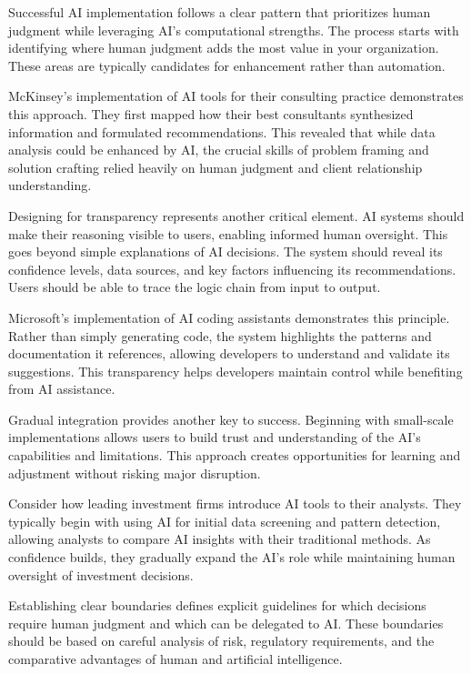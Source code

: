 \documentclass[
  Letterpaper,
]{scrbook}
\begin{document}
Successful AI implementation follows a clear pattern that prioritizes
human judgment while leveraging AI's computational strengths. The
process starts with identifying where human judgment adds the most value
in your organization. These areas are typically candidates for
enhancement rather than automation.

McKinsey's implementation of AI tools for their consulting practice
demonstrates this approach. They first mapped how their best consultants
synthesized information and formulated recommendations. This revealed
that while data analysis could be enhanced by AI, the crucial skills of
problem framing and solution crafting relied heavily on human judgment
and client relationship understanding.

Designing for transparency represents another critical element. AI
systems should make their reasoning visible to users, enabling informed
human oversight. This goes beyond simple explanations of AI decisions.
The system should reveal its confidence levels, data sources, and key
factors influencing its recommendations. Users should be able to trace
the logic chain from input to output.

Microsoft's implementation of AI coding assistants demonstrates this
principle. Rather than simply generating code, the system highlights the
patterns and documentation it references, allowing developers to
understand and validate its suggestions. This transparency helps
developers maintain control while benefiting from AI assistance.

Gradual integration provides another key to success. Beginning with
small-scale implementations allows users to build trust and
understanding of the AI's capabilities and limitations. This approach
creates opportunities for learning and adjustment without risking major
disruption.

Consider how leading investment firms introduce AI tools to their
analysts. They typically begin with using AI for initial data screening
and pattern detection, allowing analysts to compare AI insights with
their traditional methods. As confidence builds, they gradually expand
the AI's role while maintaining human oversight of investment decisions.

Establishing clear boundaries defines explicit guidelines for which
decisions require human judgment and which can be delegated to AI. These
boundaries should be based on careful analysis of risk, regulatory
requirements, and the comparative advantages of human and artificial
intelligence.
\end{document}

